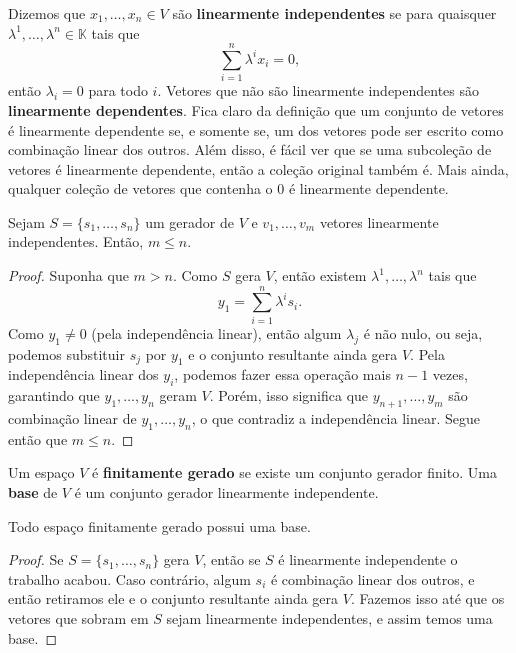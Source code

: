 Dizemos que $x_1, \dots, x_n \in V$ são \textbf{linearmente independentes} se para quaisquer $\lambda^1, \dots, \lambda^n \in \mathbb{K}$ tais que \begin{equation}
    \sum_{i = 1}^n \lambda^i x_i = 0,
\end{equation} então $\lambda_i = 0$ para todo $i$. Vetores que não são linearmente independentes são \textbf{linearmente dependentes}. Fica claro da definição que um conjunto de vetores é linearmente dependente se, e somente se, um dos vetores pode ser escrito como combinação linear dos outros. Além disso, é fácil ver que se uma subcoleção de vetores é linearmente dependente, então a coleção original também é. Mais ainda, qualquer coleção de vetores que contenha o $0$ é linearmente dependente.

\begin{lemma}\label{lemma1}
    Sejam $S = \{s_1, \dots, s_n\}$ um gerador de $V$ e $v_1, \dots, v_m$ vetores linearmente independentes. Então, $m \leq n$.
\end{lemma}
\begin{proof}
    Suponha que $m > n$. Como $S$ gera $V$, então existem $\lambda^1, \dots, \lambda^n$ tais que \begin{equation}
        y_1 = \sum_{i = 1}^n \lambda^i s_i.
    \end{equation} Como $y_1 \neq 0$ (pela independência linear), então algum $\lambda_j$ é não nulo, ou seja, podemos substituir $s_j$ por $y_1$ e o conjunto resultante ainda gera $V$. Pela independência linear dos $y_i$, podemos fazer essa operação mais $n-1$ vezes, garantindo que $y_1, \dots, y_n$ geram $V$. Porém, isso significa que $y_{n+1}, \dots, y_m$ são combinação linear de $y_1, \dots, y_n$, o que contradiz a independência linear. Segue então que $m \leq n$.
\end{proof}

Um espaço $V$ é \textbf{finitamente gerado} se existe um conjunto gerador finito. Uma \textbf{base} de $V$ é um conjunto gerador linearmente independente.

\begin{lemma}\label{lemma2}
    Todo espaço finitamente gerado possui uma base.
\end{lemma}
\begin{proof}
    Se $S = \{s_1, \dots, s_n\}$ gera $V$, então se $S$ é linearmente independente o trabalho acabou. Caso contrário, algum $s_i$ é combinação linear dos outros, e então retiramos ele e o conjunto resultante ainda gera $V$. Fazemos isso até que os vetores que sobram em $S$ sejam linearmente independentes, e assim temos uma base.
\end{proof}

